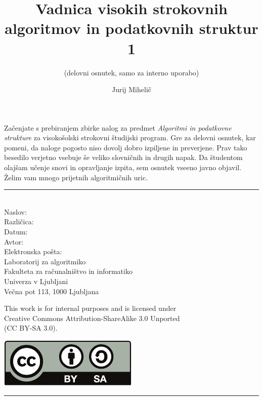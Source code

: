 \documentclass[a4paper,12pt]{scrbook}
\title{Vadnica visokih strokovnih algoritmov in podatkovnih struktur 1}
\subtitle{(delovni osnutek, samo za interno uporabo)}
\author{Jurij Mihelič}
\def\vic#1{\emph{#1}}
\begin{document}
{ %
\let\cleardoublepage\clearpage
\maketitle
\thispagestyle{empty}
\noindent
Začenjate s prebiranjem zbirke nalog za predmet \vic{Algoritmi in podatkovne strukture} za visokošolski strokovni študijski program.
Gre za delovni osnutek, kar pomeni, da naloge pogosto niso dovolj dobro izpiljene in preverjene.
Prav tako besedilo verjetno vsebuje še veliko slovničnih in drugih napak.
Da študentom olajšam učenje snovi in opravljanje izpita, sem osnutek vseeno javno objavil. Želim vam mnogo prijetnih algoritmičnih uric.
\vfill
\noindent\rule{\textwidth}{0.4pt}\\[.5\baselineskip]
Naslov: \makeatletter\@title\makeatother\\
Različica: \makeatletter\@version\makeatother\\
Datum: \makeatletter\@date\makeatother\\[\baselineskip]
Avtor: \makeatletter\@author\makeatother\\
Elektronska pošta: \makeatletter\@email\makeatother\\[\baselineskip]
Laboratorij za algoritmiko\\
Fakulteta za računalništvo in informatiko\\
Univerza v Ljubljani\\
Večna pot 113, 1000 Ljubljana\\[\baselineskip]
\parbox{12cm}{This work is for internal purposes and is licensed under\\ Creative Commons Attribution-ShareAlike 3.0 Unported\\
(CC BY-SA 3.0).}
\hfill\includegraphics[scale=0.6]{cc-by-sa.pdf}\\[.5\baselineskip]
\noindent\rule{\textwidth}{0.4pt}\\[\baselineskip]
\clearpage
}
\makeatother

\tableofcontents





%
%
%

%
%
\end{document}
